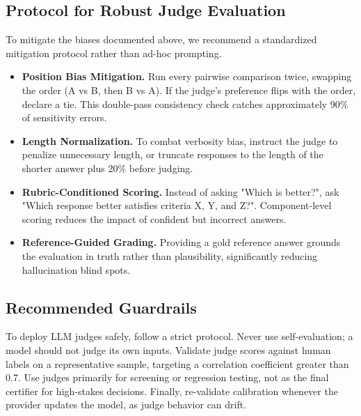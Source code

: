 \subsection{Protocol for Robust Judge Evaluation}

To mitigate the biases documented above, we recommend a standardized mitigation protocol rather than ad-hoc prompting.

\begin{itemize}
    \item \textbf{Position Bias Mitigation.} Run every pairwise comparison twice, swapping the order (A vs B, then B vs A). If the judge's preference flips with the order, declare a tie. This double-pass consistency check catches approximately 90\% of sensitivity errors.
    
    \item \textbf{Length Normalization.} To combat verbosity bias, instruct the judge to penalize unnecessary length, or truncate responses to the length of the shorter answer plus 20\% before judging.
    
    \item \textbf{Rubric-Conditioned Scoring.} Instead of asking "Which is better?", ask "Which response better satisfies criteria X, Y, and Z?". Component-level scoring reduces the impact of confident but incorrect answers.
    
    \item \textbf{Reference-Guided Grading.} Providing a gold reference answer grounds the evaluation in truth rather than plausibility, significantly reducing hallucination blind spots.
\end{itemize}

\subsection{Recommended Guardrails}

To deploy LLM judges safely, follow a strict protocol. Never use self-evaluation; a model should not judge its own inputs. Validate judge scores against human labels on a representative sample, targeting a correlation coefficient greater than 0.7. Use judges primarily for screening or regression testing, not as the final certifier for high-stakes decisions. Finally, re-validate calibration whenever the provider updates the model, as judge behavior can drift.

